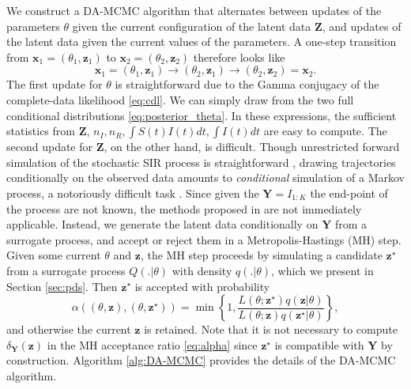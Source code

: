 \documentclass[12pt]{article}
\begin{document}
	We construct a DA-MCMC algorithm that alternates between updates of the parameters $\theta$ given the current configuration of the latent data $\mathbf{Z}$, and updates of the latent data given the current values of the parameters. A one-step transition from $\mathbf{x}_1 = (\theta_1, \mathbf{z}_1)$ to $\mathbf{x}_2 = (\theta_2, \mathbf{z}_2)$ therefore looks like
	$$\mathbf{x}_1 = (\theta_1, \mathbf{z}_1) \rightarrow (\theta_2, \mathbf{z}_1) \rightarrow (\theta_2, \mathbf{z}_2) = \mathbf{x}_2.$$
	The first update for $\theta$ is straightforward due to the Gamma conjugacy of the complete-data likelihood \eqref{eq:cdl}. We can simply draw from the two full conditional distributions \eqref{eq:posterior_theta}. In these expressions, the sufficient statistics from $\mathbf{Z}$, $n_I, n_R, \int S(t)I(t) dt, \int I(t) dt$ are easy to compute.
	The second update for $\mathbf{Z}$, on the other hand, is difficult. Though unrestricted forward simulation of the stochastic SIR process is straightforward \cite{Gillespie.1977}, drawing trajectories conditionally on the observed data amounts to \textit{conditional} simulation of a Markov process, a notoriously difficult task \cite{Hobolth.2009}. Since given the $\mathbf{Y} = I_{1:K}$ the end-point of the process are not known, the methods proposed in \cite{Hobolth.2009} are not immediately applicable.
	Instead, we generate the latent data conditionally on $\mathbf{Y}$ from a surrogate process, and accept or reject them in a Metropolis-Hastings (MH) step. Given some current $\theta$ and $\mathbf{z}$, the MH step proceeds by simulating a candidate $\mathbf{z}^\star$ from a surrogate process $Q(.|\theta)$ with density $q(.|\theta)$, which we present in Section \ref{sec:pds}. Then $\mathbf{z}^\star$ is accepted with probability
	\begin{equation}
		\label{eq:alpha}
		\alpha\left( \left( \theta, \mathbf{z}\right) , \left( \theta, \mathbf{z}^\star\right) \right) =	\min\left\lbrace 1, \dfrac{L\left( \theta; \mathbf{z}^\star\right) q\left( \mathbf{z}|\theta\right)}{L\left( \theta;\mathbf{z}\right) q\left( \mathbf{z}^\star|\theta\right)}\right\rbrace,
	\end{equation}
	and otherwise the current $\mathbf{z}$ is retained. Note that it is not necessary to compute $\delta_{\mathbf{Y}}(\mathbf{z})$ in the MH acceptance ratio \eqref{eq:alpha} since $\mathbf{z}^\star$ is compatible with $\mathbf{Y}$ by construction. Algorithm \ref{alg:DA-MCMC} provides the details of the DA-MCMC algorithm.
	
\end{document}
